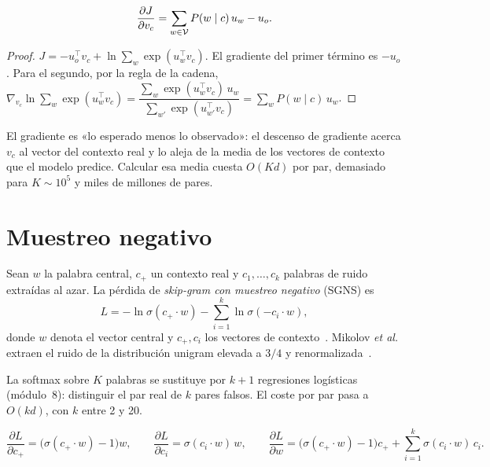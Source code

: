 \begin{proposicion}\label{prop:grad-vc}
\[
\frac{\partial J}{\partial v_c}=\sum_{w\in\mathcal{V}}P(w\mid c)\,u_w-u_o.
\]
\end{proposicion}

\begin{proof}
$J=-u_o^{\top}v_c+\ln\sum_{w}\exp(u_w^{\top}v_c)$. El gradiente del primer término es $-u_o$. Para el segundo, por la regla de la cadena, $\nabla_{v_c}\ln\sum_{w}\exp(u_w^{\top}v_c)=\dfrac{\sum_w\exp(u_w^{\top}v_c)\,u_w}{\sum_{w'}\exp(u_{w'}^{\top}v_c)}=\sum_w P(w\mid c)\,u_w$.
\end{proof}

El gradiente es «lo esperado menos lo observado»: el descenso de gradiente acerca $v_c$ al vector del contexto real y lo aleja de la media de los vectores de contexto que el modelo predice. Calcular esa media cuesta $O(Kd)$ por par, demasiado para $K\sim 10^{5}$ y miles de millones de pares.

\section{Muestreo negativo}

\begin{definicion}\label{def:sgns}
Sean $w$ la palabra central, $c_{+}$ un contexto real y $c_{1},\dots,c_{k}$ palabras de ruido extraídas al azar. La pérdida de \emph{skip-gram con muestreo negativo} (SGNS) es
\[
L=-\ln\sigma(c_{+}\cdot w)-\sum_{i=1}^{k}\ln\sigma(-c_{i}\cdot w),
\]
donde $w$ denota el vector central y $c_+,c_i$ los vectores de contexto~\cite[§5.5.2]{jm3}. Mikolov \emph{et al.} extraen el ruido de la distribución unigram elevada a $3/4$ y renormalizada~\cite{mikolov13b}.
\end{definicion}

La softmax sobre $K$ palabras se sustituye por $k+1$ regresiones logísticas (módulo~8): distinguir el par real de $k$ pares falsos. El coste por par pasa a $O(kd)$, con $k$ entre 2 y 20.

\begin{proposicion}\label{prop:grad-sgns}
\[
\frac{\partial L}{\partial c_{+}}=\bigl(\sigma(c_{+}\cdot w)-1\bigr)w,\qquad
\frac{\partial L}{\partial c_{i}}=\sigma(c_{i}\cdot w)\,w,\qquad
\frac{\partial L}{\partial w}=\bigl(\sigma(c_{+}\cdot w)-1\bigr)c_{+}+\sum_{i=1}^{k}\sigma(c_{i}\cdot w)\,c_{i}.
\]
\end{proposicion}

